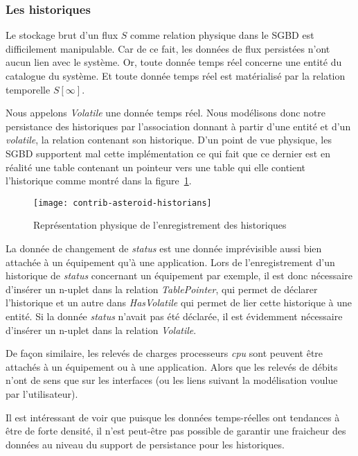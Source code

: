 \subsubsection{Les historiques}
Le stockage brut d'un flux $S$ comme relation physique dans le SGBD est difficilement manipulable. Car de ce fait, les données de flux persistées n'ont aucun lien avec le système. Or, toute donnée temps réel concerne une entité du catalogue du système. Et toute donnée temps réel est matérialisé par la relation temporelle $S[\infty]$.

Nous appelons \textit{Volatile} une donnée temps réel. Nous modélisons donc notre persistance des historiques par l'association donnant à partir d'une entité et d'un \textit{volatile}, la relation contenant son historique. D'un point de vue physique, les SGBD supportent mal cette implémentation ce qui fait que ce dernier est en réalité une table contenant un pointeur vers une table qui elle contient l'historique comme montré dans la figure~\ref{fig:contrib:asteroid:theorie:volatile}.


\begin{figure}[ht]
    \centering
    \texttt{[image: contrib-asteroid-historians]}
    \caption{Représentation physique de l'enregistrement des historiques}\label{fig:contrib:asteroid:theorie:volatile}
\end{figure}

\begin{example}
	La donnée de changement de \textit{status} est une donnée imprévisible aussi bien attachée à un équipement qu'à une application. Lors de l'enregistrement d'un historique de \textit{status} concernant un équipement par exemple, il est donc nécessaire d'insérer un n-uplet dans la relation \textit{TablePointer}, qui permet de déclarer l'historique et un autre dans \textit{HasVolatile} qui permet de lier cette historique à une entité. Si la donnée \textit{status} n'avait pas été déclarée, il est évidemment nécessaire d'insérer un n-uplet dans la relation \textit{Volatile}.
	
	De façon similaire, les relevés de charges processeurs \textit{cpu} sont peuvent être attachés à un équipement ou à une application. Alors que les relevés de débits n'ont de sens que sur les interfaces (ou les liens suivant la modélisation voulue par l'utilisateur).
\end{example}

Il est intéressant de voir que puisque les données temps-réelles ont tendances à être de forte densité, il n'est peut-être pas possible de garantir une fraicheur des données au niveau du support de persistance pour les historiques.

